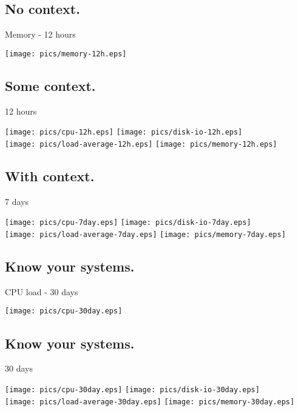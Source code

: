 \documentclass[xga]{xdvislides}
\begin{document}
\subsection{No context.}
Memory - 12 hours
\begin{center}
	\texttt{[image: pics/memory-12h.eps]}
\end{center}

\subsection{Some context.}
12 hours
\begin{center}
	\texttt{[image: pics/cpu-12h.eps]}
	\texttt{[image: pics/disk-io-12h.eps]} \\
	\texttt{[image: pics/load-average-12h.eps]}
	\texttt{[image: pics/memory-12h.eps]} \\
\end{center}

\subsection{With context.}
7 days
\begin{center}
	\texttt{[image: pics/cpu-7day.eps]}
	\texttt{[image: pics/disk-io-7day.eps]} \\
	\texttt{[image: pics/load-average-7day.eps]}
	\texttt{[image: pics/memory-7day.eps]} \\
\end{center}

\subsection{Know your systems.}
CPU load - 30 days
\begin{center}
	\texttt{[image: pics/cpu-30day.eps]}
\end{center}

\subsection{Know your systems.}
30 days
\begin{center}
	\texttt{[image: pics/cpu-30day.eps]}
	\texttt{[image: pics/disk-io-30day.eps]} \\
	\texttt{[image: pics/load-average-30day.eps]}
	\texttt{[image: pics/memory-30day.eps]} \\
\end{center}
\end{document}
